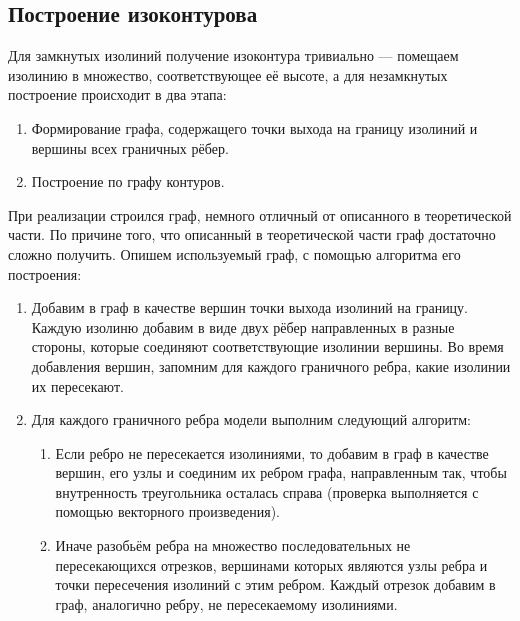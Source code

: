 \documentclass[12pt,a4paper,oneside]{extarticle}
\begin{document}
    \subsection{Построение изоконтурова}
        Для замкнутых изолиний получение изоконтура тривиально --- помещаем изолинию в множество, соответствующее её высоте, а для незамкнутых построение происходит в два этапа:

        \begin{enumerate}
            \item Формирование графа, содержащего точки выхода на границу изолиний и вершины всех граничных рёбер.
            \item Построение по графу контуров.
        \end{enumerate}

        При реализации строился граф, немного отличный от описанного в теоретической части.
        По причине того, что описанный в теоретической части граф достаточно сложно получить.
        Опишем используемый граф, с помощью алгоритма его построения:

        \begin{enumerate}
            \item Добавим в граф в качестве вершин точки выхода изолиний на границу.
            Каждую изолиню добавим в виде двух рёбер направленных в разные стороны, которые соединяют соответствующие изолинии вершины. Во время добавления вершин, запомним для каждого граничного ребра, какие изолинии их пересекают.
            \item Для каждого граничного ребра модели выполним следующий алгоритм:
            \begin{enumerate}
                \item Если ребро не пересекается изолиниями, то добавим в граф в качестве вершин, его узлы и соединим их ребром графа, направленным так, чтобы внутренность треугольника осталась справа (проверка выполняется с помощью векторного произведения).
                \item Иначе разобьём ребра на множество последовательных не пересекающихся отрезков, вершинами которых являются узлы ребра и точки пересечения изолиний с этим ребром. Каждый отрезок добавим в граф, аналогично ребру, не пересекаемому изолиниями.
            \end{enumerate}
        \end{enumerate}
\end{document}
